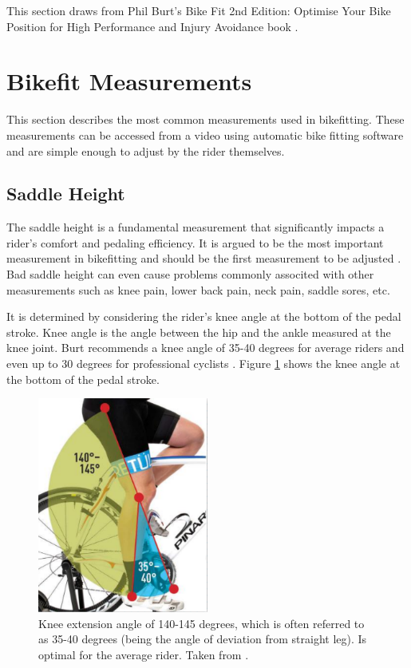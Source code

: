 This section draws from Phil Burt's Bike Fit 2nd Edition: Optimise Your Bike Position for High Performance and Injury Avoidance book \cite{burtbikefit}.

\section{Bikefit Measurements}
This section describes the most common measurements used in bikefitting. These measurements can be accessed from a video using automatic bike fitting software and are simple enough to adjust by the rider themselves.

\subsection{Saddle Height}
The saddle height is a fundamental measurement that significantly impacts a rider's comfort and pedaling efficiency. It is argued to be the most important measurement in bikefitting and should be the first measurement to be adjusted \cite{burtbikefit}. Bad saddle height can even cause problems commonly associted with other measurements such as knee pain, lower back pain, neck pain, saddle sores, etc.

It is determined by considering the rider's knee angle at the bottom of the pedal stroke. Knee angle is the angle between the hip and the ankle measured at the knee joint. Burt recommends a knee angle of 35-40 degrees for average riders and even up to 30 degrees for professional cyclists \cite{burtbikefit}. Figure \ref{fig:saddle_height} shows the knee angle at the bottom of the pedal stroke.

\begin{figure}[htbp]
    \centering
    \includegraphics[width=0.5\textwidth]{obrazky-figures/burt_knee_angle.png}
    \caption{Knee extension angle of 140-145 degrees, which is often referred to as 35-40 degrees (being the angle of deviation from straight leg). Is optimal for the average rider. Taken from \cite{burtbikefit}.}
    \label{fig:saddle_height}
\end{figure}



